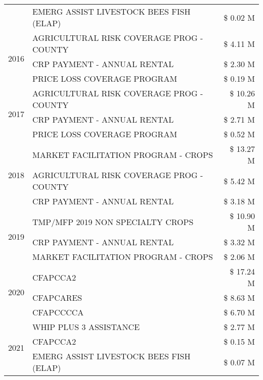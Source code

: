 \begin{tabular}{llr}
 & EMERG ASSIST LIVESTOCK BEES FISH (ELAP) & \$ 0.02 M \\
\cline{1-3}
\multirow[t]{3}{*}{2016} & AGRICULTURAL RISK COVERAGE PROG - COUNTY & \$ 4.11 M \\
 & CRP PAYMENT - ANNUAL RENTAL & \$ 2.30 M \\
 & PRICE LOSS COVERAGE PROGRAM & \$ 0.19 M \\
\cline{1-3}
\multirow[t]{3}{*}{2017} & AGRICULTURAL RISK COVERAGE PROG - COUNTY & \$ 10.26 M \\
 & CRP PAYMENT - ANNUAL RENTAL & \$ 2.71 M \\
 & PRICE LOSS COVERAGE PROGRAM & \$ 0.52 M \\
\cline{1-3}
\multirow[t]{3}{*}{2018} & MARKET FACILITATION PROGRAM - CROPS & \$ 13.27 M \\
 & AGRICULTURAL RISK COVERAGE PROG - COUNTY & \$ 5.42 M \\
 & CRP PAYMENT - ANNUAL RENTAL & \$ 3.18 M \\
\cline{1-3}
\multirow[t]{3}{*}{2019} & TMP/MFP 2019 NON SPECIALTY CROPS & \$ 10.90 M \\
 & CRP PAYMENT - ANNUAL RENTAL & \$ 3.32 M \\
 & MARKET FACILITATION PROGRAM - CROPS & \$ 2.06 M \\
\cline{1-3}
\multirow[t]{3}{*}{2020} & CFAPCCA2 & \$ 17.24 M \\
 & CFAPCARES & \$ 8.63 M \\
 & CFAPCCCCA & \$ 6.70 M \\
\cline{1-3}
\multirow[t]{3}{*}{2021} & WHIP PLUS 3 ASSISTANCE & \$ 2.77 M \\
 & CFAPCCA2 & \$ 0.15 M \\
 & EMERG ASSIST LIVESTOCK BEES FISH (ELAP) & \$ 0.07 M \\
\cline{1-3}
\bottomrule
\end{tabular}
